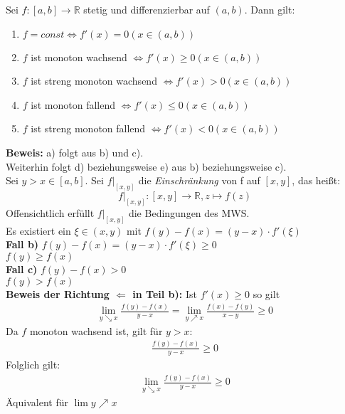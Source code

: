 \begin{Satz}{
	\label{satz_11}
	Sei $f:[a,b] \rightarrow \mathbb{R}$ stetig und differenzierbar auf $(a,b)$. 
	Dann gilt:
	\renewcommand{\labelenumi}{\alph{enumi})}
	\begin{enumerate}
		\item $f = const \Leftrightarrow f'(x) = 0 (x\in(a,b))$
		\item $f$ ist monoton wachsend $\Leftrightarrow f'(x) \geq 0 (x \in (a,b))$
		\item $f$ ist streng monoton wachsend $\Leftrightarrow f'(x) > 0 (x \in (a,b
		))$
		\item $f$ ist monoton fallend $\Leftrightarrow f'(x) \leq 0 (x \in (a,b))$
		\item $f$ ist streng monoton fallend $\Leftrightarrow f'(x) < 0 
		(x \in (a,b))$ 
	\end{enumerate}
	\textbf{Beweis:} a) folgt aus b) und c). \\
	Weiterhin folgt d) beziehungsweise e) aus b) beziehungsweise c). \\
	Sei $ y > x \in [a,b]$. Sei $f|_{[x,y]}$ die \textit{Einschränkung} 
	von f auf $[x,y]$, das heißt: 
	\begin{equation*}
		f|_{[x,y]} : [x,y] \rightarrow \mathbb{R}, z \mapsto f(z)
	\end{equation*}
	Offensichtlich erfüllt $f|_{[x,y]}$ die Bedingungen des MWS. \\
	Es existiert 
	ein $\xi \in (x,y)$ mit $f(y)-f(x) = (y-x)\cdot f'(\xi)$\\
	\textbf{Fall b)} $f(y)-f(x) = (y-x)\cdot f'(\xi) \geq 0$ \\
	\hspace*{1.5cm} $f(y) \geq f(x) $ \\
	\textbf{Fall c)} $f(y)-f(x) > 0$ \\
	\hspace*{1.5cm}$f(y) > f(x)$ \\
	\textbf{Beweis der Richtung $\Leftarrow$ in Teil b):} Ist $f'(x) \geq 0$ so gilt
	\begin{align*}
		\lim\limits_{y \searrow x}{\frac{f(y)-f(x)}{y-x}}
		=\lim\limits_{y \nearrow x}{\frac{f(x) -f(y)}{x-y}} \geq 0
	\end{align*}
	Da $f$ monoton wachsend ist, gilt für $y > x$: 
	\begin{align*}
		\frac{f(y)-f(x)}{y-x} \geq 0
	\end{align*}	 
	Folglich gilt: 
	\begin{align*}
		\lim\limits_{y \searrow x}{\frac{f(y)-f(x)}{y-x} } \geq 0
	\end{align*}
	Äquivalent für $\lim\limits{y \nearrow x}{ }$ 
}\end{Satz}



